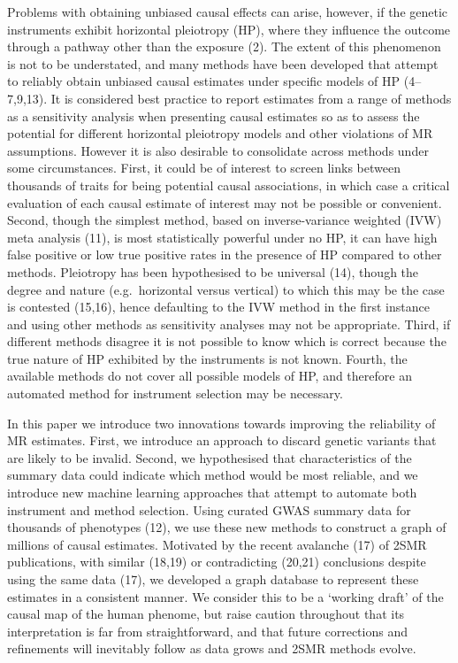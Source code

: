 \documentclass[]{article}
\begin{document}
Problems with obtaining unbiased causal effects can arise, however, if
the genetic instruments exhibit horizontal pleiotropy (HP), where they
influence the outcome through a pathway other than the exposure (2). The
extent of this phenomenon is not to be understated, and many methods
have been developed that attempt to reliably obtain unbiased causal
estimates under specific models of HP (4--7,9,13). It is considered best
practice to report estimates from a range of methods as a sensitivity
analysis when presenting causal estimates so as to assess the potential
for different horizontal pleiotropy models and other violations of MR
assumptions. However it is also desirable to consolidate across methods
under some circumstances. First, it could be of interest to screen links
between thousands of traits for being potential causal associations, in
which case a critical evaluation of each causal estimate of interest may
not be possible or convenient. Second, though the simplest method, based
on inverse-variance weighted (IVW) meta analysis (11), is most
statistically powerful under no HP, it can have high false positive or
low true positive rates in the presence of HP compared to other methods.
Pleiotropy has been hypothesised to be universal (14), though the degree
and nature (e.g.~horizontal versus vertical) to which this may be the
case is contested (15,16), hence defaulting to the IVW method in the
first instance and using other methods as sensitivity analyses may not
be appropriate. Third, if different methods disagree it is not possible
to know which is correct because the true nature of HP exhibited by the
instruments is not known. Fourth, the available methods do not cover all
possible models of HP, and therefore an automated method for instrument
selection may be necessary.

In this paper we introduce two innovations towards improving the
reliability of MR estimates. First, we introduce an approach to discard
genetic variants that are likely to be invalid. Second, we hypothesised
that characteristics of the summary data could indicate which method
would be most reliable, and we introduce new machine learning approaches
that attempt to automate both instrument and method selection. Using
curated GWAS summary data for thousands of phenotypes (12), we use these
new methods to construct a graph of millions of causal estimates.
Motivated by the recent avalanche (17) of 2SMR publications, with
similar (18,19) or contradicting (20,21) conclusions despite using the
same data (17), we developed a graph database to represent these
estimates in a consistent manner. We consider this to be a `working
draft' of the causal map of the human phenome, but raise caution
throughout that its interpretation is far from straightforward, and that
future corrections and refinements will inevitably follow as data grows
and 2SMR methods evolve.
\end{document}
